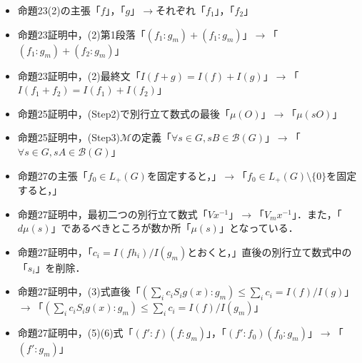 \begin{itemize}
\item 命題23(2)の主張「$f$」，「$g$」$\rightarrow$それぞれ「$f_1$」，「$f_2$」
\item 命題23証明中，(2)第1段落「$(f_1 : g_m )+(f_1 : g_m)$」$\rightarrow$「$(f_1 : g_m )+(f_2 : g_m)$」 
\item 命題23証明中，(2)最終文「$I(f+g)=I(f)+I(g)$」$\rightarrow$「$I(f_1+f_2)=I(f_1)+I(f_2)$」
\item 命題25証明中，(Step2)で別行立て数式の最後「$\mu(O)$」$\rightarrow$「$\mu(sO)$」
\item 命題25証明中，(Step3)$\mathscr{M}$の定義「$\forall s \in G , sB \in \mathscr{B}(G)$」$\rightarrow$「$\forall s \in G , sA \in \mathscr{B}(G)$」
\item 命題27の主張「$f_0 \in L_{+}(G)$を固定すると，」$\rightarrow$「$f_0 \in L_{+}(G) \setminus \{ 0 \}$を固定すると，」
\item 命題27証明中，最初二つの別行立て数式「$Vx^{-1}$」$\rightarrow$「$V_{m}x^{-1}$」．また，「$d\mu (s)$」であるべきところが数か所「$\mu (s)$」となっている．
\item 命題27証明中，「$c_i=I(fh_i)/I(g_{m})$とおくと，」直後の別行立て数式中の「$s_i$」を削除．
\item 命題27証明中，(3)式直後「$\left( \sum_{i}c_{i}S_{i}g(x) : g_{m} \right) \le \sum_{i}c_{i}=I(f)/I(g)$」$\rightarrow$「$\left( \sum_{i}c_{i}S_{i}g(x) : g_{m} \right) \le \sum_{i}c_{i}=I(f)/I(g_{m})$」
\item 命題27証明中，(5)(6)式「$\left( f' : f \right) \left( f : g_{m} \right)$」，「$\left( f' : f_0 \right) \left( f_0 : g_{m} \right)$」$\rightarrow$「$\left( f' : g_{m} \right)$」
\end{itemize}
